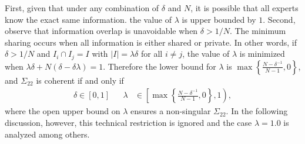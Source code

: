 \documentclass[11pt]{article}
\theoremstyle{definition}
\theoremstyle{definition}
\begin{document}
First, given that under any combination of $\delta$ and $N$, it is possible that all experts know the exact same information. the value of $\lambda$ is upper bounded by $1$. Second, observe that information overlap is unavoidable when $\delta > 1/N$. The minimum sharing occurs when all information is either shared or private. In other words, if $\delta > 1/N$ and $I_{i} \cap I_j = I$ with $|I| =  \lambda \delta$ for all $i \neq j$, the value of $\lambda$ is minimized when $\lambda\delta + N(\delta - \delta\lambda) = 1$. Therefore the lower bound for $\lambda$ is $\max \left\{ \frac{N-\delta^{-1}}{N-1}, 0\right\}$, and $\Sigma_{22}$ is coherent if and only if
\begin{align}
\delta \in [0,1] &&  \lambda &\in \left[  \max \left\{ \frac{N-\delta^{-1}}{N-1}, 0\right\}, 1 \right), \label{rhoDomain}
\end{align}
where the open upper bound on $\lambda$ ensures a non-singular $\Sigma_{22}$. In the following discussion, however, this technical restriction is ignored and the case $\lambda = 1.0$ is analyzed among others. 

\end{document}
